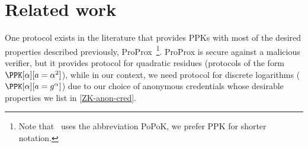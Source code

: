 \section{Related work}%
\label{related-work}

One protocol exists in the literature that provides \acp{PPK} with most of the desired properties described previously, ProProx~\cite{ProProx}\footnote{Note that~\cite{ProProx} uses the abbreviation PoPoK, we prefer \acs{PPK} for shorter notation.}.
ProProx is secure against a malicious verifier, but it provides  protocol for quadratic residues (\ie protocols of the form \(\PPK[\alpha][a = 
  \alpha^2]\)), while in our context, we need  protocol for discrete logarithms (\ie \(\PPK[\alpha][a = g^\alpha]\)) due to our choice of anonymous credentials whose desirable properties we list in \cref{ZK-anon-cred}.%

  



